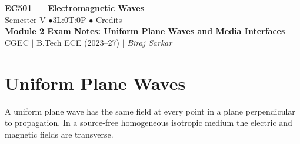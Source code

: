 \documentclass[12pt,a4paper]{article}
\begin{document}

\begin{center}
  {\LARGE\bfseries\color{myred} EC501 --- Electromagnetic Waves}\\[5pt]
  {\normalsize\color{mydark} Semester V \quad$\bullet$\quad 3L:0T:0P \quad$\bullet$ Credits}\\[3pt]
  {\normalsize\color{myteal}\textbf{Module 2 Exam Notes: Uniform Plane Waves and Media Interfaces}}\\[3pt]
  {\small\color{mydark} CGEC \;$|$\; B.Tech ECE (2023--27) \;$|$\; \textit{Biraj Sarkar}}
\end{center}
\vspace{2pt}
\noindent{\color{myred}\rule{\linewidth}{1.5pt}}
\vspace{2pt}

\hypersetup{linkcolor=mydark}
\tableofcontents
\hypersetup{linkcolor=myteal}
\newpage

\section{Uniform Plane Waves}
\begin{tcolorbox}[defbox,title={Uniform plane wave}]
A uniform plane wave has the same field at every point in a plane perpendicular to propagation. In a source-free homogeneous isotropic medium the electric and magnetic fields are transverse.
\end{tcolorbox}
\end{document}

